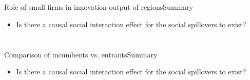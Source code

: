 \documentclass{beamer}
\begin{document}
\section{\cite{Agrawal2014}}
\begin{frame}{Role of small firms in innovation output of regions}{Summary}
\begin{itemize}
\item{Is there a causal social interaction effect for the social spillovers to exist?}
\end{itemize}
\end{frame}



\section{\cite{igami2015}}
\begin{frame}{Comparison of incumbents vs. entrants}{Summary}
\begin{itemize}
\item{Is there a causal social interaction effect for the social spillovers to exist?}
\end{itemize}
\end{frame}



\end{document}
